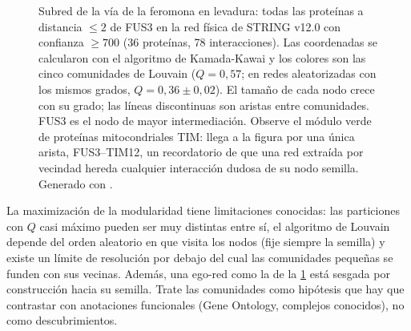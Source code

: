 \begin{figure}[!t]
\centering
{}
\caption[Comunidades en la vecindad de FUS3]{Subred de la vía de la feromona en levadura: todas las proteínas a distancia $\le2$ de FUS3 en la red física de STRING v12.0 con confianza $\ge700$ (36 proteínas, 78 interacciones). Las coordenadas se calcularon con el algoritmo de Kamada-Kawai y los colores son las cinco comunidades de Louvain ($Q=0{,}57$; en redes aleatorizadas con los mismos grados, $Q=0{,}36\pm0{,}02$). El tamaño de cada nodo crece con su grado; las líneas discontinuas son aristas entre comunidades. FUS3 es el nodo de mayor intermediación. Observe el módulo verde de proteínas mitocondriales TIM: llega a la figura por una única arista, FUS3--TIM12, un recordatorio de que una red extraída por vecindad hereda cualquier interacción dudosa de su nodo semilla. Generado con .}
\label{fig:16-fus3}
\end{figure}

\begin{cuidado}
La maximización de la modularidad tiene limitaciones conocidas: las particiones con $Q$ casi máximo pueden ser muy distintas entre sí, el algoritmo de Louvain depende del orden aleatorio en que visita los nodos (fije siempre la semilla) y existe un límite de resolución por debajo del cual las comunidades pequeñas se funden con sus vecinas. Además, una ego-red como la de la \cref{fig:16-fus3} está sesgada por construcción hacia su semilla. Trate las comunidades como hipótesis que hay que contrastar con anotaciones funcionales (Gene Ontology, complejos conocidos), no como descubrimientos.
\end{cuidado}

